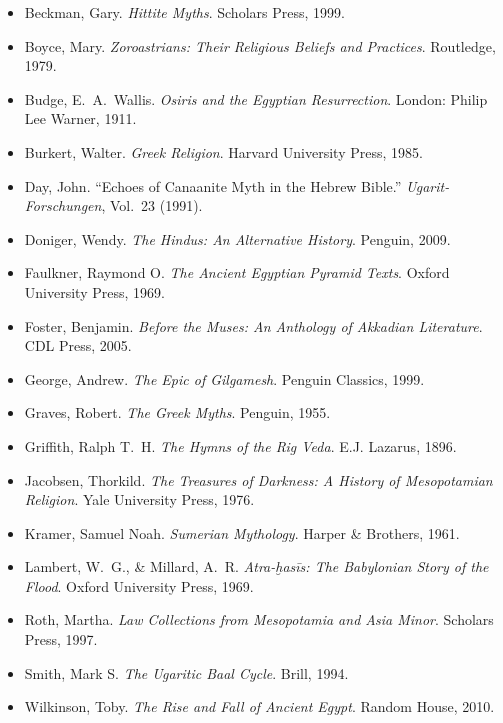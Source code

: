 \documentclass[11pt,a4paper]{article}
\begin{document}
\begin{itemize}[leftmargin=1.2cm]
  \item Beckman, Gary. \emph{Hittite Myths}. Scholars Press, 1999.
  \item Boyce, Mary. \emph{Zoroastrians: Their Religious Beliefs and Practices}. Routledge, 1979.
  \item Budge, E.\ A.\ Wallis. \emph{Osiris and the Egyptian Resurrection}. London: Philip Lee Warner, 1911.
  \item Burkert, Walter. \emph{Greek Religion}. Harvard University Press, 1985.
  \item Day, John. “Echoes of Canaanite Myth in the Hebrew Bible.” \emph{Ugarit-Forschungen}, Vol.\ 23 (1991).
  \item Doniger, Wendy. \emph{The Hindus: An Alternative History}. Penguin, 2009.
  \item Faulkner, Raymond O. \emph{The Ancient Egyptian Pyramid Texts}. Oxford University Press, 1969.
  \item Foster, Benjamin. \emph{Before the Muses: An Anthology of Akkadian Literature}. CDL Press, 2005.
  \item George, Andrew. \emph{The Epic of Gilgamesh}. Penguin Classics, 1999.
  \item Graves, Robert. \emph{The Greek Myths}. Penguin, 1955.
  \item Griffith, Ralph T.\ H. \emph{The Hymns of the Rig Veda}. E.J. Lazarus, 1896.
  \item Jacobsen, Thorkild. \emph{The Treasures of Darkness: A History of Mesopotamian Religion}. Yale University Press, 1976.
  \item Kramer, Samuel Noah. \emph{Sumerian Mythology}. Harper \& Brothers, 1961.
  \item Lambert, W.\ G., \& Millard, A.\ R. \emph{Atra-ḫasīs: The Babylonian Story of the Flood}. Oxford University Press, 1969.
  \item Roth, Martha. \emph{Law Collections from Mesopotamia and Asia Minor}. Scholars Press, 1997.
  \item Smith, Mark S. \emph{The Ugaritic Baal Cycle}. Brill, 1994.
  \item Wilkinson, Toby. \emph{The Rise and Fall of Ancient Egypt}. Random House, 2010.
\end{itemize}
\end{document}
